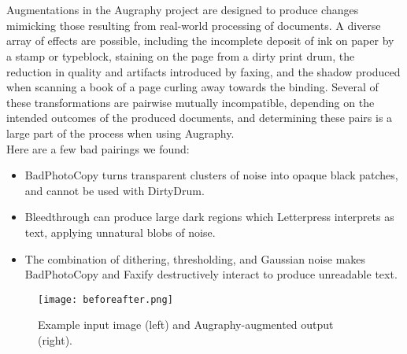 \documentclass[runningheads]{llncs}
\begin{document}
\noindent\fbox{\begin{minipage}{\textwidth}
{\color{red}{$\leftarrow$ bleedthrough\_intensity\_range=(0.1, 0.2)}}

{\color{blue}{$\rightarrow$   bleedthrough\_intensity\_range=(0.05, 0.15)}}\\

{\color{red}{$\leftarrow$ bleedthrough\_color\_range=(0, 224)}}

{\color{blue}{$\rightarrow$ bleedthrough\_color\_range=(32, 224)}}\\

{\color{red}{$\leftarrow$ bleedthrough\_alpha=random.uniform(0.1,0.2)}}

{\color{blue}{$\rightarrow$    bleedthrough\_alpha=random.uniform(0.05,0.1)}}
\end{minipage}}
\hspace{1cm}\\\\
\indent Augmentations in the Augraphy project are designed to produce changes mimicking those resulting from real-world processing of documents. A diverse array of effects are possible, including the incomplete deposit of ink on paper by a stamp or typeblock, staining on the page from a dirty print drum, the reduction in quality and artifacts introduced by faxing, and the shadow produced when scanning a book of a page curling away towards the binding. Several of these transformations are pairwise mutually incompatible, depending on the intended outcomes of the produced documents, and determining these pairs is a large part of the process when using Augraphy.\\

Here are a few bad pairings we found:

\begin{itemize}
\item BadPhotoCopy turns transparent clusters of noise into opaque black patches, and cannot be used with DirtyDrum.
\item Bleedthrough can produce large dark regions which Letterpress interprets as text, applying unnatural blobs of noise.
\item The combination of dithering, thresholding, and Gaussian noise makes BadPhotoCopy and Faxify destructively interact to produce unreadable text.
\end{itemize}

\begin{figure}
    \centering
    \texttt{[image: beforeafter.png]}
    \caption{Example input image (left) and Augraphy-augmented output (right).}
    \label{fig:3panel}
\end{figure}
\end{document}
